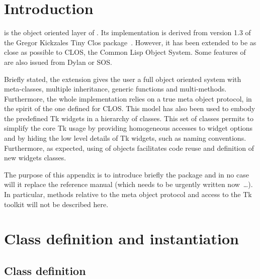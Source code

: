 %
%
%

\section{Introduction}

{\stklos} is the object oriented layer of {\stk}. Its implementation is
derived from version 1.3 of the Gregor Kickzales Tiny Clos
package~\cite{Tiny-Clos}.  However, it has been extended to be as close as
possible to CLOS, the Common Lisp Object System{\cite{CLtL2}}. Some features
of {\stklos} are also issued from Dylan{\cite{Dylan}} or SOS{\cite{SOS}}.

Briefly stated, the {\stklos} extension gives the user a full object
oriented system with meta-classes, multiple inheritance, generic
functions and multi-methods.  Furthermore, the whole implementation
relies on a true meta object protocol, in the spirit of the one
defined for CLOS\cite{AMOP}. This model has also been used to embody
the predefined Tk widgets in a hierarchy of {\stklos} classes. This
set of classes permits to simplify the core Tk usage by providing
homogeneous accesses to widget options and by hiding the low level
details of Tk widgets, such as naming conventions. Furthermore, as
expected, using of objects facilitates code reuse and definition
of new widgets classes.

The purpose of this appendix is to introduce briefly the {\stklos}
package and in no case will it replace the {\stklos} reference manual (which
needs to be urgently written now~\ldots).
In particular, methods relative to the meta object
protocol and access to the Tk toolkit will not be described here.

\section{Class definition and instantiation}

\subsection {Class definition}

